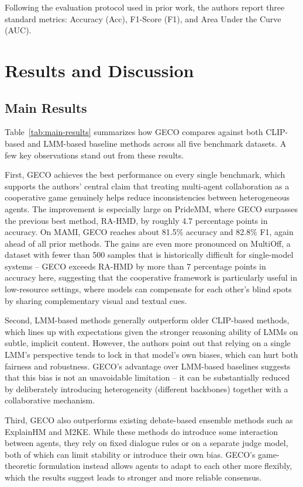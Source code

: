 \documentclass[manuscript,review]{acmart}
\begin{document}
Following the evaluation protocol used in prior work, the authors report three standard
metrics: Accuracy (Acc), F1-Score (F1), and Area Under the Curve (AUC).

\section{Results and Discussion}

\subsection{Main Results}

Table~\ref{tab:main-results} summarizes how GECO compares against both CLIP-based and
LMM-based baseline methods across all five benchmark datasets. A few key observations
stand out from these results.

First, GECO achieves the best performance on every single benchmark, which supports the
authors' central claim that treating multi-agent collaboration as a cooperative game
genuinely helps reduce inconsistencies between heterogeneous agents. The improvement is
especially large on PrideMM, where GECO surpasses the previous best method, RA-HMD, by
roughly 4.7 percentage points in accuracy. On MAMI, GECO reaches about 81.5\% accuracy
and 82.8\% F1, again ahead of all prior methods. The gains are even more pronounced on
MultiOff, a dataset with fewer than 500 samples that is historically difficult for
single-model systems -- GECO exceeds RA-HMD by more than 7 percentage points in accuracy
here, suggesting that the cooperative framework is particularly useful in low-resource
settings, where models can compensate for each other's blind spots by sharing
complementary visual and textual cues.

Second, LMM-based methods generally outperform older CLIP-based methods, which lines up
with expectations given the stronger reasoning ability of LMMs on subtle, implicit
content. However, the authors point out that relying on a single LMM's perspective tends
to lock in that model's own biases, which can hurt both fairness and robustness. GECO's
advantage over LMM-based baselines suggests that this bias is not an unavoidable
limitation -- it can be substantially reduced by deliberately introducing heterogeneity
(different backbones) together with a collaborative mechanism.

Third, GECO also outperforms existing debate-based ensemble methods such as ExplainHM and
M2KE. While these methods do introduce some interaction between agents, they rely on
fixed dialogue rules or on a separate judge model, both of which can limit stability or
introduce their own bias. GECO's game-theoretic formulation instead allows agents to
adapt to each other more flexibly, which the results suggest leads to stronger and more
reliable consensus.
\end{document}
